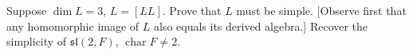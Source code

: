 Suppose $\dim L = 3$, $L = [LL]$. Prove that $L$ must be simple. [Observe first that any homomorphic image of $L$ also equals its derived algebra.] Recover the simplicity of $\mathfrak{sl}(2, F)$, $\operatorname{char} F \neq 2$.
